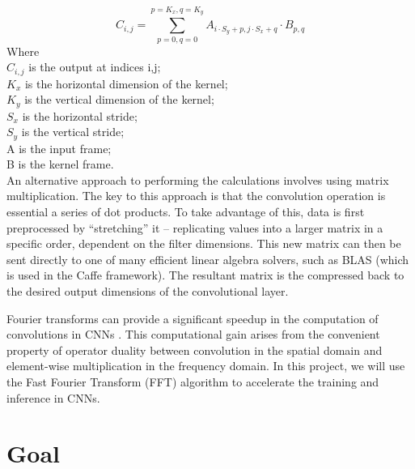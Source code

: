 \documentclass[conference,compsoc]{IEEEtran/IEEEtran}
\begin{document}
\begin{equation}\label{eq:conv}
C_{i,j} = \sum_{p=0,q=0}^{p=K_x,q=K_y}A_{i\cdot S_y + p, j\cdot S_x + q}\cdot B_{p,q} 
\end{equation}
Where\\ 
\hspace*{2em} $C_{i,j}$ is the output at indices i,j;\\
\hspace*{2em} $K_x$ is the horizontal dimension of the kernel;\\
\hspace*{2em} $K_y$ is the vertical dimension of the kernel;\\
\hspace*{2em} $S_x$ is the horizontal stride;\\
\hspace*{2em} $S_y$ is the vertical stride;\\
\hspace*{2em} A is the input frame;\\
\hspace*{2em} B is the kernel frame.\\

An alternative approach to performing the calculations involves using matrix multiplication.
The key to this approach is that the convolution operation is essential a series of dot products.
To take advantage of this, data is first preprocessed by ``stretching'' it -- replicating values into a larger matrix in a specific order, dependent on the filter dimensions.
This new matrix can then be sent directly to one of many efficient linear algebra solvers, such as BLAS (which is used in the Caffe framework).
The resultant matrix is the compressed back to the desired output dimensions of the convolutional layer.

Fourier transforms can provide a significant speedup in the computation of convolutions in CNNs \cite{FFT1, FFT2}. This computational gain arises from the convenient property of operator duality between convolution in the spatial domain and element-wise multiplication in the frequency domain. In this project, we will use the Fast Fourier Transform (FFT) algorithm to accelerate the training and inference in CNNs.


\section{Goal}\label{section:goal}
\end{document}
